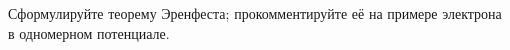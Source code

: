 \documentclass[__main__.tex]{subfiles}
\begin{document}
Сформулируйте теорему Эренфеста; прокомментируйте её на примере электрона в одномерном потенциале.\\ 

\end{document}
